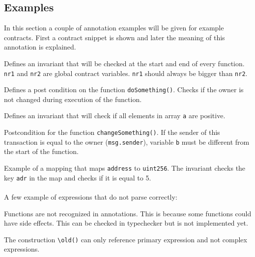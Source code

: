 \documentclass[a4paper]{article}
\begin{document}
\subsection{Examples}
In this section a couple of annotation examples will be given for example contracts. First a contract snippet is shown and later the meaning of this annotation is explained.\\
\noindent\makebox[\linewidth]{\rule{\linewidth}{0.4pt}}

Defines an invariant that will be checked at the start and end of every function. \texttt{nr1} and \texttt{nr2} are global contract variables. \texttt{nr1} should always be bigger than \texttt{nr2}.\\
\noindent\makebox[\linewidth]{\rule{\linewidth}{0.4pt}}

Defines a post condition on the function \texttt{doSomething()}. Checks if the owner is not changed during execution of the function.\\
\noindent\makebox[\linewidth]{\rule{\linewidth}{0.4pt}}

Defines an invariant that will check if all elements in array \texttt{a} are positive.\\
\noindent\makebox[\linewidth]{\rule{\linewidth}{0.4pt}}

Postcondition for the function \texttt{changeSomething()}. If the sender of this transaction is equal to the owner (\texttt{msg.sender}), variable \texttt{b} must be different from the start of the function.\\
\noindent\makebox[\linewidth]{\rule{\linewidth}{0.4pt}} 

Example of a mapping that maps \texttt{address} to \texttt{uint256}. The invariant checks the key \texttt{adr} in the map and checks if it is equal to 5. \hfill\\
\noindent\makebox[\linewidth]{\rule{\linewidth}{0.4pt}}
\vspace{3cm}\\
A few example of expressions that do not parse correctly:\\
\noindent\makebox[\linewidth]{\rule{\linewidth}{0.4pt}}

Functions are not recognized in annotations. This is because some functions could have side effects. This can be checked in typechecker but is not implemented yet.\\
\noindent\makebox[\linewidth]{\rule{\linewidth}{0.4pt}}

The construction \texttt{\textbackslash old()} can only reference primary expression and not complex expressions.\\
\noindent\makebox[\linewidth]{\rule{\linewidth}{0.4pt}}
\end{document}
